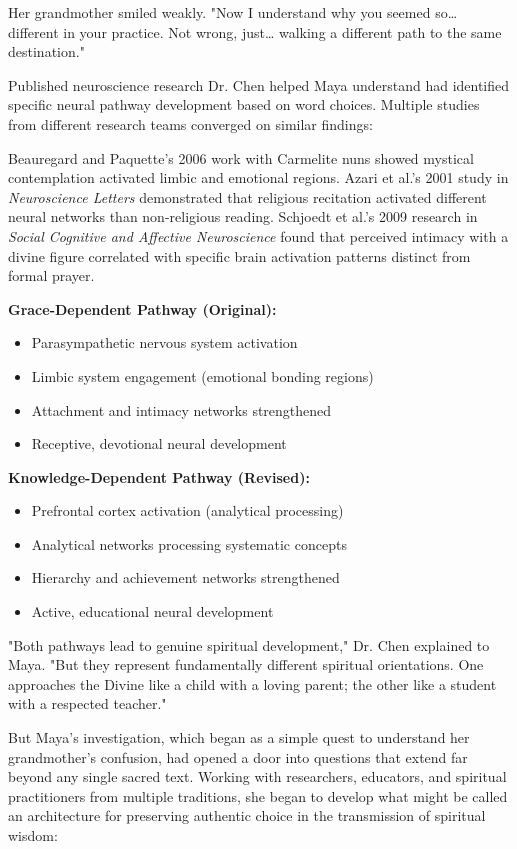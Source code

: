 \documentclass[12pt,twoside]{book}
\begin{document}
Her grandmother smiled weakly. "Now I understand why you seemed so\ldots{} different in your practice. Not wrong, just\ldots{} walking a different path to the same destination."

Published neuroscience research Dr. Chen helped Maya understand had identified specific neural pathway development based on word choices. Multiple studies from different research teams converged on similar findings:

Beauregard and Paquette's 2006 work with Carmelite nuns showed mystical contemplation activated limbic and emotional regions. Azari et al.'s 2001 study in \emph{Neuroscience Letters} demonstrated that religious recitation activated different neural networks than non-religious reading. Schjoedt et al.'s 2009 research in \emph{Social Cognitive and Affective Neuroscience} found that perceived intimacy with a divine figure correlated with specific brain activation patterns distinct from formal prayer.

\textbf{\textbf{Grace-Dependent Pathway (Original):}}
\begin{itemize}
\item Parasympathetic nervous system activation
\item Limbic system engagement (emotional bonding regions)
\item Attachment and intimacy networks strengthened
\item Receptive, devotional neural development
\end{itemize}

\textbf{\textbf{Knowledge-Dependent Pathway (Revised):}}
\begin{itemize}
\item Prefrontal cortex activation (analytical processing)
\item Analytical networks processing systematic concepts
\item Hierarchy and achievement networks strengthened
\item Active, educational neural development
\end{itemize}

"Both pathways lead to genuine spiritual development," Dr. Chen explained to Maya. "But they represent fundamentally different spiritual orientations. One approaches the Divine like a child with a loving parent; the other like a student with a respected teacher."

But Maya's investigation, which began as a simple quest to understand her grandmother's confusion, had opened a door into questions that extend far beyond any single sacred text. Working with researchers, educators, and spiritual practitioners from multiple traditions, she began to develop what might be called an architecture for preserving authentic choice in the transmission of spiritual wisdom:
\end{document}
